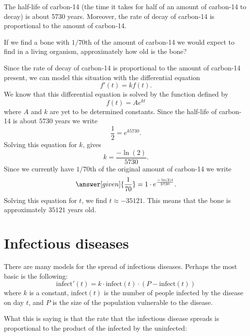 \documentclass{ximera}
\begin{document}
\begin{example}
The half-life of carbon-14 (the time it takes for half of an amount of
carbon-14 to decay) is about 5730 years. Moreover, the rate of decay
of carbon-14 is proportional to the amount of carbon-14.

If we find a bone with $1/70$th of the amount of carbon-14 we would
expect to find in a living organism, approximately how old is the
bone?

\begin{explanation}
Since the rate of decay of carbon-14 is proportional to the amount of
carbon-14 present, we can model this situation with the differential
equation
\[
f'(t) = k f(t).
\]
We know that this differential equation is solved by the function
defined by
\[
f(t) = A e^{kt}
\]
where $A$ and $k$ are yet to be determined constants. Since the
half-life of carbon-14 is about $5730$ years we write
\[
\frac{1}{2} = e^{k 5730}.
\]
Solving this equation for $k$, gives
\[
k = \frac{-\ln(2)}{5730}.
\]
Since we currently have $1/70$th of the original amount of carbon-14
we write
\[
\answer[given]{\frac{1}{70}} = 1\cdot e^{\frac{-\ln(2)t}{5730}}.
\]
Solving this equation for $t$, we find $t \approx -35121$. This means
that the bone is approximately $35121$ years old.
\end{explanation}
\end{example}




\section{Infectious diseases}

There are many models for the spread of infectious diseases. Perhaps
the most basic is the following:
\[
\mathrm{infect}'(t) = k\cdot \mathrm{infect}(t)\cdot(P-\mathrm{infect}(t))
\]
where $k$ is a constant, $\mathrm{infect}(t)$ is the number of people
infected by the disease on day $t$, and $P$ is the size of the
population vulnerable to the disease.

What this is saying is that the rate that the infectious disease
spreads is proportional to the product of the infected by the
uninfected:
  \begin{image}
  \end{image}
\end{document}
